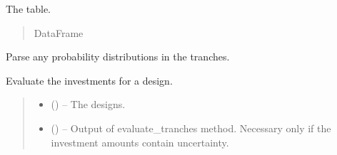\documentclass[letterpaper,10pt,english]{sphinxmanual}
\begin{document}
\begin{fulllineitems}
\begin{fulllineitems}
\label{\detokenize{tyche:tyche.Investments.Investments.investments}}
\pysigstartsignatures
{}
\pysigstopsignatures
\sphinxAtStartPar
The  table.
\begin{quote}\begin{description}
\sphinxAtStartPar
DataFrame

\end{description}\end{quote}

\end{fulllineitems}


\begin{fulllineitems}
\label{\detokenize{tyche:tyche.Investments.Investments.compile}}
\pysigstartsignatures
{}
\pysigstopsignatures
\sphinxAtStartPar
Parse any probability distributions in the tranches.

\end{fulllineitems}


\begin{fulllineitems}
\label{\detokenize{tyche:tyche.Investments.Investments.evaluate_investments}}
\pysigstartsignatures
{}
\pysigstopsignatures
\sphinxAtStartPar
Evaluate the investments for a design.
\begin{quote}\begin{description}
\begin{itemize}
\item {} 
\sphinxAtStartPar
{} () – The designs.

\item {} 
\sphinxAtStartPar
{} () – Output of evaluate\_tranches method. Necessary only if the investment amounts contain uncertainty.


\end{itemize}
\end{description}
\end{quote}
\end{fulllineitems}
\end{fulllineitems}
\end{document}
